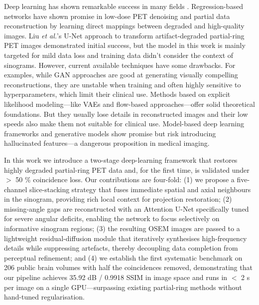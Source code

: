 \documentclass[aps,prb,preprint,groupedaddress,showkeys]{revtex4}
\begin{document}
Deep learning has shown remarkable success in many fields \cite{PhysRevD.110.063011, liu2024deep, reader2020deep}. Regression-based networks have shown promise in low-dose PET denoising and partial data reconstruction \cite{Kandarpa_2021} by learning direct mappings between degraded and high-quality images. Liu \textit{et al.}'s U-Net approach to transform artifact-degraded partial-ring PET images \cite{liu2019} demonstrated initial success, but the model in this work is mainly targeted for mild data loss and training data didn't consider the context of sinograms.
However, current available techniques have some drawbacks.
For examples, while GAN approaches are good at generating visually compelling reconstructions, \cite{xue2023cg3dsrganclassificationguided3d} they are unstable when training and often highly sensitive to hyperparameters, which limit their clinical use.
Methods based on explicit likelihood modeling—like VAEs and flow-based approaches—offer solid theoretical foundations. But they usually lose details in reconstructed images and their low speeds also make them not suitable for clinical use.
Model-based deep learning frameworks and generative models \cite{reader2023, vashistha2024} show promise but risk introducing hallucinated features—a dangerous proposition in medical imaging.

In this work we introduce a two-stage deep-learning framework that restores highly degraded partial-ring PET data and, for the first time, is validated under $>$ 50 \% coincidence loss.  Our contributions are four-fold: 
(1) we propose a five-channel slice-stacking strategy that fuses immediate spatial and axial neighbours in the sinogram, providing rich local context for projection restoration; 
(2) missing‐angle gaps are reconstructed with an Attention U-Net specifically tuned for severe angular deficits, enabling the network to focus selectively on informative sinogram regions; 
(3) the resulting OSEM images are passed to a lightweight residual-diffusion module that iteratively synthesises high-frequency details while suppressing artefacts, thereby decoupling data completion from perceptual refinement; 
and (4) we establish the first systematic benchmark on 206 public brain volumes with half the coincidences removed, demonstrating that our pipeline achieves 35.92 dB / 0.9918 SSIM in image space and runs in $<$ 2 s per image on a single GPU—surpassing existing partial-ring methods without hand-tuned regularisation.
\end{document}
